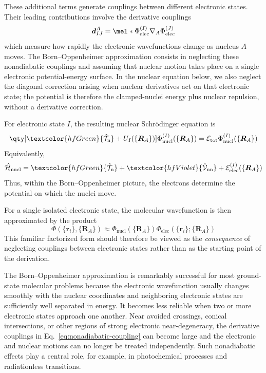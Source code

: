 \documentclass[11pt,a4paper,titlepage]{article}
\numberwithin{equation}{section}
\newcommand{\bd}{\boldsymbol{d}}
\newcommand{\br}{\boldsymbol{r}}
\newcommand{\bR}{\boldsymbol{R}}
\newcommand{\chH}{\Hat{\mathcal{H}}}
\newcommand{\chT}{\Hat{\mathcal{T}}}
\newcommand{\chV}{\Hat{\mathcal{V}}}
\newcommand{\cE}{\mathcal{E}}
\newcommand{\green}[1]{\textcolor{hfGreen}{#1}}
\newcommand{\violet}[1]{\textcolor{hfViolet}{#1}}
\begin{document}
These additional terms generate couplings between different electronic
states. Their leading contributions involve the derivative couplings
\begin{equation}
  \bd_{IJ}^{A}
  =
  \mel*{
    \Phi_\text{elec}^{(I)}
  }{
    \nabla_A
  }{
    \Phi_\text{elec}^{(J)}
  }
  \label{eq:nonadiabatic-coupling}
\end{equation}
which measure how rapidly the electronic wavefunctions change as nucleus $A$
moves. The Born--Oppenheimer approximation consists in neglecting these
nonadiabatic couplings and assuming that nuclear motion takes place on a
single electronic potential-energy surface. In the nuclear equation below,
we also neglect the diagonal correction arising when nuclear derivatives
act on that electronic state; the potential is therefore the clamped-nuclei
energy plus nuclear repulsion, without a derivative correction.

For electronic state $I$, the resulting nuclear Schr\"odinger equation is
\begin{equation}
  \qty[
    \green{\chT_\text{n}}
    +
    U_I(\{\bR_A\})
  ]
  \Phi_\text{nucl}^{(I)}(\{\bR_A\})
  =
  \cE_\text{tot}
  \Phi_\text{nucl}^{(I)}(\{\bR_A\})
  \label{eq:nuclear-BO}
\end{equation}
Equivalently,
\begin{equation}
  \chH_\text{nucl}
  =
  \green{\chT_\text{n}}
  +
  \violet{\chV_\text{nn}}
  +
  \cE_\text{elec}^{(I)}(\{\bR_A\})
\end{equation}
Thus, within the Born--Oppenheimer picture, the electrons determine the
potential on which the nuclei move.

For a single isolated electronic state, the molecular wavefunction is then
approximated by the product
\begin{equation}
  \Phi(\{\br_i\},\{\bR_A\})
  \approx
  \Phi_\text{nucl}(\{\bR_A\})
  \Phi_\text{elec}(\{\br_i\};\{\bR_A\})
  \label{eq:BO-product}
\end{equation}
This familiar factorized form should therefore be viewed as the
\emph{consequence} of neglecting couplings between electronic states rather
than as the starting point of the derivation.

The Born--Oppenheimer approximation is remarkably successful for most
ground-state molecular problems because the electronic wavefunction usually
changes smoothly with the nuclear coordinates and neighboring electronic
states are sufficiently well separated in energy. It becomes less reliable
when two or more electronic states approach one another. Near avoided
crossings, conical intersections, or other regions of strong electronic
near-degeneracy, the derivative couplings in
Eq.~\eqref{eq:nonadiabatic-coupling} can become large and the electronic and
nuclear motions can no longer be treated independently. Such nonadiabatic
effects play a central role, for example, in photochemical processes and
radiationless transitions.
\end{document}
